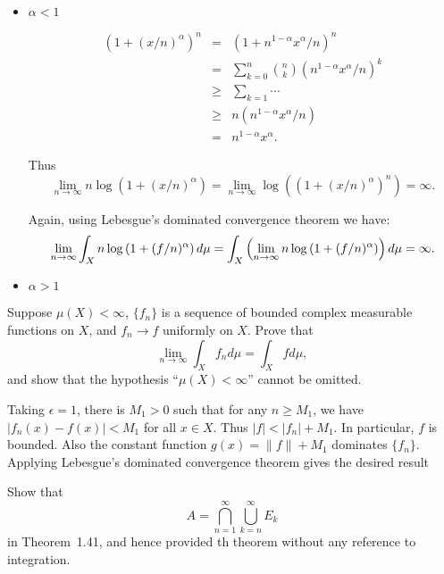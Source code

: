 \begin{enumerate}
\begin{itemize}
 \item \(\alpha<1\)

 \begin{eqnarray*}
      \left(1 + (x/n)^\alpha\right)^n
 &=& (1 + n^{1-\alpha}x^\alpha/n)^n \\
 &=& \sum_{k=0}^n \binom{n}{k}\left(n^{1-\alpha}x^\alpha/n\right)^k \\
 &\geq& \sum_{k=1} \cdots \\
 &\geq& n(n^{1-\alpha}x^\alpha/n) \\
 &=& n^{1-\alpha}x^\alpha.
 \end{eqnarray*}

 Thus
 \begin{equation*}
 \lim_{n\to\infty} n\log(1 + (x/n)^\alpha)
 = \lim_{n\to\infty} \log\left((1 + (x/n)^\alpha)^n\right) = \infty.
 \end{equation*}

 Again, using Lebesgue's dominated convergence theorem
 we have:
 \begin{equation*}
 \lim_{n\to\infty} \int_X n\log \left(1 + (f/n)^\alpha\right)d\mu \\
 = \int_X
      \left(\lim_{n\to\infty} n\log \left(1+(f/n)^\alpha\right)\right)d\mu \\
 = \infty.
 \end{equation*}

 \item \(\alpha>1\)

\end{itemize}
\fi %


\begin{excopy} %
Suppose \(\mu(X)<\infty\), \(\{f_n\}\) is a sequence of bounded complex
measurable functions on $X$, and \(f_n\to f\) uniformly on $X$. Prove that
\begin{equation*}
\lim_{n\to\infty} \int_X f_n d\mu = \int_X fd\mu,
\end{equation*}
and show that the hypothesis ``\(\mu(X)<\infty\)'' cannot be omitted.
\end{excopy}

Taking \(\epsilon = 1\), there is \(M_1>0\) such that
for any \(n\geq M_1\), we have \(|f_n(x) - f(x)| < M_1\) for all \(x\in X\).
Thus \(|f| < |f_n| + M_1\). In particular, $f$ is bounded.
Also the constant function \(g(x) = \|f\| + M_1\) dominates \(\{f_n\}\).
Applying Lebesgue's dominated convergence theorem gives the desired result

\begin{excopy} %
Show that
\begin{equation*}
 A = \bigcap_{n=1}^\infty \bigcup_{k=n}^\infty E_k
\end{equation*}
in Theorem~1.41, and hence provided th theorem without any reference
to integration.
\end{excopy}


\end{enumerate}
